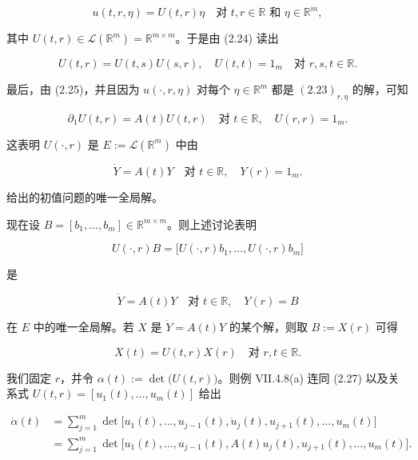 \begin{proposition}
\begin{equation}
u(t,r,\eta) = U(t,r)\eta \quad \text{对 } t,r \in \mathbb{R} \text{ 和 } \eta \in \mathbb{R}^m ,\tag{2.25}
\end{equation}

其中 $ U(t,r) \in \mathcal{L}(\mathbb{R}^m) = \mathbb{R}^{m\times m} $。于是由 (2.24) 读出

\begin{equation}
U(t,r) = U(t,s)U(s,r) , \quad U(t,t) = 1_m \quad \text{对 } r,s,t \in \mathbb{R} .\tag{2.26}
\end{equation}

最后，由 (2.25)，并且因为 $ u(\cdot,r,\eta) $ 对每个 $ \eta \in \mathbb{R}^m $ 都是 $ (2.23)_{r,\eta} $ 的解，可知

\begin{equation}
\partial_1U(t,r) = A(t)U(t,r) \quad \text{对 } t \in \mathbb{R} , \quad U(r,r) = 1_m .\tag{2.27}
\end{equation}

这表明 $ U(\cdot,r) $ 是 $ E := \mathcal{L}(\mathbb{R}^m) $ 中由

\[
\dot{Y} = A(t)Y \quad \text{对 } t \in \mathbb{R} , \quad Y(r) = 1_m .
\]

给出的初值问题的唯一全局解。

现在设 $ B = [b_1,\ldots,b_m] \in \mathbb{R}^{m\times m} $。则上述讨论表明

\[
U(\cdot,r)B = \big[U(\cdot,r)b_1,\ldots,U(\cdot,r)b_m\big]
\]

是

\[
\dot{Y} = A(t)Y \quad \text{对 } t \in \mathbb{R} , \quad Y(r) = B
\]

在 $ E $ 中的唯一全局解。若 $ X $ 是 $ \dot{Y} = A(t)Y $ 的某个解，则取 $ B := X(r) $ 可得

\begin{equation}
X(t) = U(t,r)X(r) \quad \text{对 } r,t \in \mathbb{R} .\tag{2.28}
\end{equation}

我们固定 $ r $，并令 $ \alpha(t) := \det\big(U(t,r)\big) $。则例 VII.4.8(a) 连同 (2.27) 以及关系式 $ U(t,r) = [u_1(t),\ldots,u_m(t)] $ 给出

\begin{equation}
\begin{aligned}
\dot{\alpha}(t) &= \sum_{j=1}^{m}\det\big[u_1(t),\ldots,u_{j-1}(t),\dot{u}_j(t),u_{j+1}(t),\ldots,u_m(t)\big] \\ &= \sum_{j=1}^{m}\det\big[u_1(t),\ldots,u_{j-1}(t),A(t)u_j(t),u_{j+1}(t),\ldots,u_m(t)\big] .
\end{aligned}\tag{2.29}
\end{equation}


\end{proposition}
